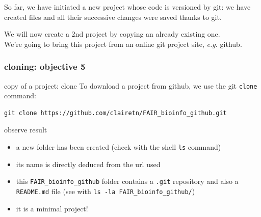 \begin{frame}{}
\begin{exampleblock}{}%
     So far, we have initiated a new project whose code is versioned by git: we have created files and all their successive changes were saved thanks to git.
\end{exampleblock}
\begin{exampleblock}{}%
    We will now create a 2nd project by copying an already existing one.\\ We're going to bring this project from an online git project site, \textit{e.g.} github.
\end{exampleblock}
\end{frame}
\begin{frame}[containsverbatim]
\frametitle{ cloning: objective 5}
\begin{exampleblock}{copy of a project: clone}
To download a project from github, we use the git \verb|clone| command:
\begin{lstlisting}
git clone https://github.com/clairetn/FAIR_bioinfo_github.git
\end{lstlisting}
\end{exampleblock}
\begin{exampleblock}{observe result}
\begin{itemize}
    \item a new folder has been created (check with the shell \verb|ls| command)
    \item its name is directly deduced from the url used
    \item this \verb|FAIR_bioinfo_github| folder contains a \verb|.git| repository and also a \verb|README.md| file (see with \verb|ls -la FAIR_bioinfo_github/|)
    \item it is a minimal project!
\end{itemize}
\end{exampleblock}
\end{frame}
